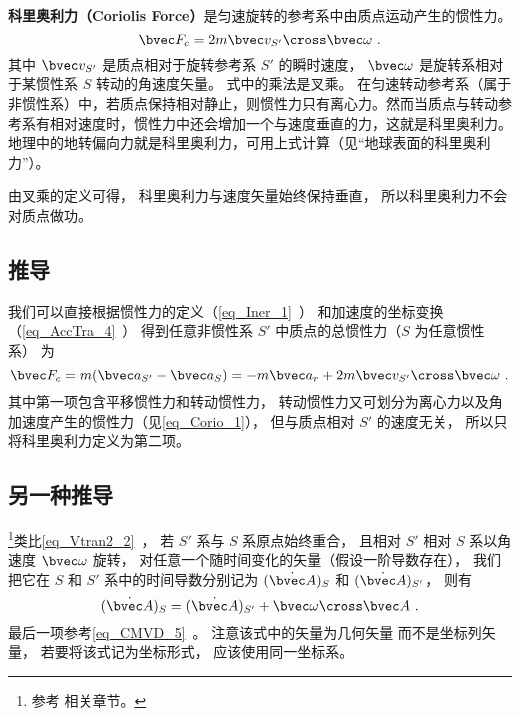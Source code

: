 

\textbf{科里奥利力（Coriolis Force）}是匀速旋转的参考系中由质点运动产生的惯性力。
\begin{equation}
\bvec F_c = 2m \bvec v_{S'} \cross \bvec \omega~.
\end{equation}
其中 $\bvec v_{S'}$ 是质点相对于旋转参考系 $S'$ 的瞬时速度， $\bvec\omega$ 是旋转系相对于某惯性系 $S$ 转动的角速度矢量。
式中的乘法是叉乘。
在匀速转动参考系（属于非惯性系）中，若质点保持相对静止，则惯性力只有离心力。然而当质点与转动参考系有相对速度时，惯性力中还会增加一个与速度垂直的力，这就是科里奥利力。地理中的地转偏向力就是科里奥利力，可用上式计算（见“地球表面的科里奥利力”）。

由叉乘的定义可得， 科里奥利力与速度矢量始终保持垂直， 所以科里奥利力不会对质点做功。

\subsection{推导}
我们可以直接根据惯性力的定义（\autoref{eq_Iner_1}~） 和加速度的坐标变换（\autoref{eq_AccTra_4}~） 得到任意非惯性系 $S'$ 中质点的总惯性力（$S$ 为任意惯性系） 为
\begin{equation}
\bvec F_c = m( \bvec a_{S'} - \bvec a_{S} ) = -m\bvec a_{r} + 2 m \bvec v_{S'} \cross  \bvec \omega~.
\end{equation}
其中第一项包含平移惯性力和转动惯性力， 转动惯性力又可划分为离心力以及角加速度产生的惯性力（见\autoref{eq_Corio_1}）， 但与质点相对 $S'$ 的速度无关， 所以只将科里奥利力定义为第二项。

\subsection{另一种推导}\label{sub_Corio_1}
\footnote{参考 \cite{Goldstein} 相关章节。}类比\autoref{eq_Vtran2_2}~， 若 $S'$ 系与 $S$ 系原点始终重合， 且相对 $S'$ 相对 $S$ 系以角速度 $\bvec\omega$ 旋转， 对任意一个随时间变化的矢量（假设一阶导数存在）， 我们把它在 $S$ 和 $S'$ 系中的时间导数分别记为 $(\dot{\bvec A})_{S}$ 和 $(\dot{\bvec A})_{S'}$， 则有
\begin{equation}\label{eq_Corio_4}
(\dot{\bvec A})_{S} = (\dot{\bvec A})_{S'} + \bvec\omega\cross\bvec A~.
\end{equation}
最后一项参考\autoref{eq_CMVD_5}~。 注意该式中的矢量为几何矢量 而不是坐标列矢量， 若要将该式记为坐标形式， 应该使用同一坐标系。

